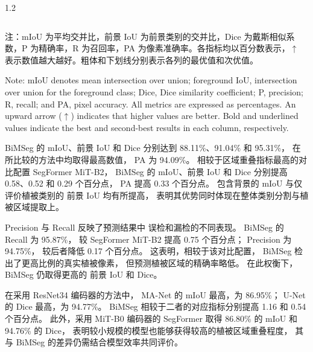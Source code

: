 \begin{table}[!htb]
\begin{spacing}{1.2}
\begin{tabular*}{\linewidth}{@{\extracolsep{\fill}}llrrrrrr@{}}
      \bottomrule
    \end{tabular*}
  \end{spacing}
  \par\vspace{8pt}
  \noindent\begin{minipage}{\linewidth}
    \normalfont{}\raggedright
    \noindent 注：mIoU 为平均交并比，前景 IoU 为前景类别的交并比，Dice 为戴斯相似系数，P 为精确率，R 为召回率，PA 为像素准确率。各指标均以百分数表示，\(\uparrow\) 表示数值越大越好。粗体和下划线分别表示各列的最优值和次优值。\par
    \vspace{2pt}
    \noindent Note: mIoU denotes mean intersection over union; foreground IoU, intersection over union for the foreground class; Dice, Dice similarity coefficient; P, precision; R, recall; and PA, pixel accuracy. All metrics are expressed as percentages. An upward arrow (\(\uparrow\)) indicates that higher values are better. Bold and underlined values indicate the best and second-best results in each column, respectively.\par
  \end{minipage}\par
\end{table}



BiMSeg 的 mIoU、前景 IoU 和 Dice
分别达到 88.11\%、91.04\% 和 95.31\%，
在所比较的方法中均取得最高数值，
PA 为 94.09\%。
相较于区域重叠指标最高的对比配置
SegFormer MiT-B2，
BiMSeg 的 mIoU、前景 IoU 和 Dice
分别提高 0.58、0.52 和 0.29 个百分点，
PA 提高 0.33 个百分点。
包含背景的 mIoU 与仅评价植被类别的
前景 IoU 均有所提高，
表明其优势同时体现在整体类别分割与植被区域提取上。

Precision 与 Recall 反映了预测结果中
误检和漏检的不同表现。
BiMSeg 的 Recall 为 95.87\%，
较 SegFormer MiT-B2 提高 0.75 个百分点；
Precision 为 94.75\%，
较后者降低 0.17 个百分点。
这表明，相较于该对比配置，
BiMSeg 检出了更高比例的真实植被像素，
但预测植被区域的精确率略低。
在此权衡下，BiMSeg 仍取得更高的
前景 IoU 和 Dice。

在采用 ResNet34 编码器的方法中，
MA-Net 的 mIoU 最高，为 86.95\%；
U-Net 的 Dice 最高，为 94.77\%。
BiMSeg 相较于二者的对应指标分别提高
1.16 和 0.54 个百分点。
此外，采用 MiT-B0 编码器的 SegFormer
取得 86.80\% 的 mIoU 和 94.76\% 的 Dice，
表明较小规模的模型也能够获得较高的植被区域重叠程度，
其与 BiMSeg 的差异仍需结合模型效率共同评价。\par



